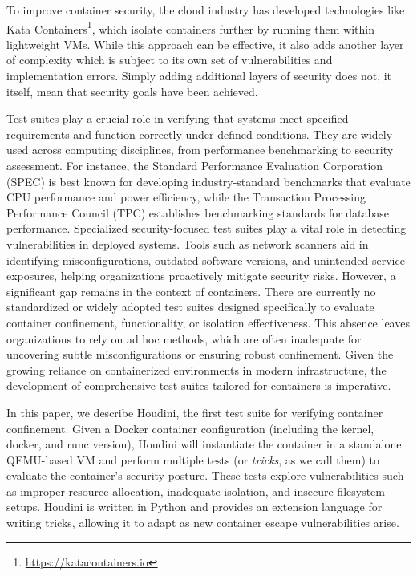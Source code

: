 \documentclass[12pt]{report}
\begin{document}
\begin{doublespace}
To improve container security, the cloud industry has developed technologies like Kata Containers\footnote{\url{https://katacontainers.io}}, which isolate containers further by running them within lightweight VMs. While this approach can be effective, it also adds another layer of complexity which is subject to its own set of vulnerabilities and implementation errors. Simply adding additional layers of security does not, it itself, mean that security goals have been achieved.

Test suites play a crucial role in verifying that systems meet specified requirements and function correctly under defined conditions. They are widely used across computing disciplines, from performance benchmarking to security assessment. For instance, the Standard Performance Evaluation Corporation (SPEC) \cite{henning2000spec} is best known for developing industry-standard benchmarks that evaluate CPU performance and power efficiency, while the Transaction Processing Performance Council (TPC) \cite{10.1007/978-3-642-18206-8_1} establishes benchmarking standards for database performance.
Specialized security-focused test suites play a vital role in detecting vulnerabilities in deployed systems. Tools such as network scanners aid in identifying misconfigurations, outdated software versions, and unintended service exposures, helping organizations proactively mitigate security risks. However, a significant gap remains in the context of containers. There are currently no standardized or widely adopted test suites designed specifically to evaluate container confinement, functionality, or isolation effectiveness. This absence leaves organizations to rely on ad hoc methods, which are often inadequate for uncovering subtle misconfigurations or ensuring robust confinement. Given the growing reliance on containerized environments in modern infrastructure, the development of comprehensive test suites tailored for containers is imperative.

In this paper, we describe Houdini, the first test suite for verifying container confinement. Given a Docker container configuration (including the kernel, docker, and runc version), Houdini will instantiate the container in a standalone QEMU-based VM and perform multiple tests (or \textit{tricks}, as we call them) to evaluate the container's security posture. These tests explore vulnerabilities such as improper resource allocation, inadequate isolation, and insecure filesystem setups. Houdini is written in Python and provides an extension language for writing tricks, allowing it to adapt as new container escape vulnerabilities arise.


\end{doublespace}
\end{document}
